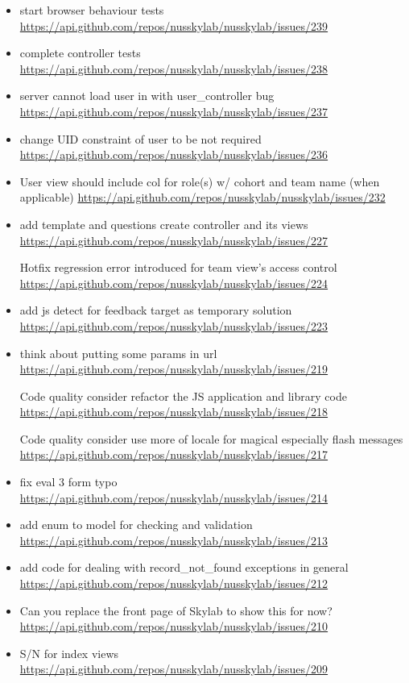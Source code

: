{\begin{itemize}[noitemsep]
    \item start browser behaviour tests \url{https://api.github.com/repos/nusskylab/nusskylab/issues/239} 
    \item complete controller tests \url{https://api.github.com/repos/nusskylab/nusskylab/issues/238} 
    \item server cannot load user in with user\_controller bug \url{https://api.github.com/repos/nusskylab/nusskylab/issues/237} 
    \item change UID constraint of user to be not required \url{https://api.github.com/repos/nusskylab/nusskylab/issues/236} 
    \item User view should include col for role(s) w/ cohort  and team name (when applicable) \url{https://api.github.com/repos/nusskylab/nusskylab/issues/232} 
    \item add template and questions create controller and its views \url{https://api.github.com/repos/nusskylab/nusskylab/issues/227} 
    \item [Hotfix] regression error introduced for team view's access control \url{https://api.github.com/repos/nusskylab/nusskylab/issues/224} 
    \item add js detect for feedback target as temporary solution \url{https://api.github.com/repos/nusskylab/nusskylab/issues/223} 
    \item think about putting some params in url \url{https://api.github.com/repos/nusskylab/nusskylab/issues/219} 
    \item [Code quality]consider refactor the JS application and library code \url{https://api.github.com/repos/nusskylab/nusskylab/issues/218} 
    \item [Code quality]consider use more of locale for magical  especially flash messages \url{https://api.github.com/repos/nusskylab/nusskylab/issues/217} 
    \item fix eval 3 form typo \url{https://api.github.com/repos/nusskylab/nusskylab/issues/214} 
    \item add enum to model for checking and validation \url{https://api.github.com/repos/nusskylab/nusskylab/issues/213} 
    \item add code for dealing with record\_not\_found exceptions in general \url{https://api.github.com/repos/nusskylab/nusskylab/issues/212} 
    \item Can you replace the front page of Skylab to show this for now? \url{https://api.github.com/repos/nusskylab/nusskylab/issues/210} 
    \item S/N for index views \url{https://api.github.com/repos/nusskylab/nusskylab/issues/209} 

\end{itemize}}

